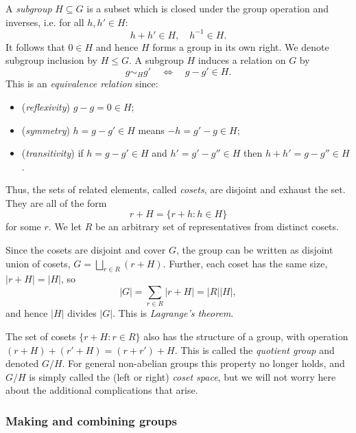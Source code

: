 \documentclass[aps, pre,reprint,nofootinbib,citeautoscript,floatfix]{revtex4-1}
\begin{document}
A \emph{subgroup} $H \subseteq G$ is a subset which is closed under the
group operation and inverses, i.e. for all $h, h'\in H$:
\begin{equation}
  \label{eq:58}
  h + h' \in H, \quad h^{-1} \in H.
\end{equation}
It follows that $0 \in H$ and hence $H$ forms a group in its own right.
We denote subgroup inclusion by $H \leq G$.
A subgroup $H$ induces a relation on $G$ by
\begin{equation}
  \label{eq:59}
  g \sim_H g' \quad \Longleftrightarrow \quad g -g' \in H.
\end{equation}
This is an \emph{equivalence relation} since:
\begin{itemize}[itemsep=0pt]
\item (\emph{reflexivity}) $g - g = 0 \in H$;
\item (\emph{symmetry}) $h = g - g' \in H$ means
  $-h = g'-g\in H$; 
\item (\emph{transitivity}) if $h = g - g' \in H$ and $h' = g' - g''
  \in H$ then $h+h'=g - g'' \in H$.
\end{itemize}
Thus, the sets of related elements, called \emph{cosets}, are disjoint and exhaust the set.
They are all of the form
\begin{equation}
  \label{eq:60}
  r + H = \{r + h: h\in H\}
\end{equation}
for some $r$.
We let $R$ be an arbitrary set of representatives from distinct cosets.

Since the cosets are disjoint and cover $G$, the group can be written as disjoint
union of cosets, $G = \bigsqcup_{r\in R} (r + H)$.
Further, each coset has the same size, $|r + H| = |H|$, so
\begin{equation}
  \label{eq:lagrange}
  |G| = \sum_{r\in R} | r + H| = |R| |H|,
\end{equation}
and hence $|H|$ divides $|G|$. This is \emph{Lagrange's
  theorem}.

The set of cosets $\{r + H : r\in R\}$ also has the structure of a group,
with operation $(r + H) + (r' + H) = (r + r') + H$.
This is called the \emph{quotient group} and denoted $G/H$.
For general non-abelian groups this property no longer holds, and
$G/H$ is simply called the (left or right) \emph{coset space}, but we
will not worry here about the additional complications that arise.

\subsubsection*{Making and combining groups}
\label{sec:combining-groups}
\end{document}
